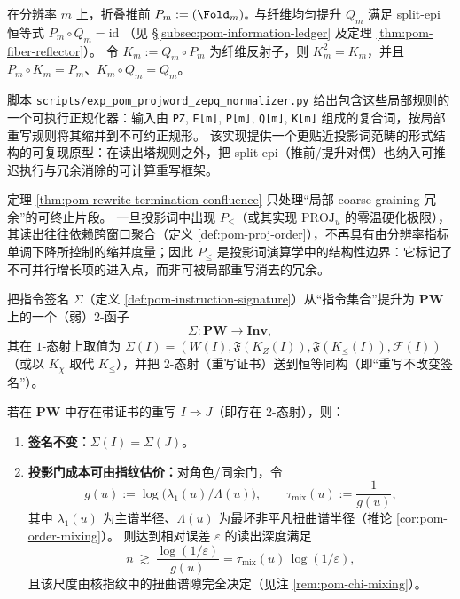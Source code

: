 \begin{remark}\label{rem:pom-projword-zepq-normalizer-script}
在分辨率 \(m\) 上，折叠推前 \(P_m:=(\Fold_m)_*\) 与纤维均匀提升 \(Q_m\) 满足 split-epi 恒等式
\(
P_m\circ Q_m=\mathrm{id}
\)
（见 \S\ref{subsec:pom-information-ledger} 及定理 \ref{thm:pom-fiber-reflector}）。
令 \(K_m:=Q_m\circ P_m\) 为纤维反射子，则 \(K_m^2=K_m\)，并且 \(P_m\circ K_m=P_m\)、\(K_m\circ Q_m=Q_m\)。
\par
脚本 \texttt{scripts/exp\_pom\_projword\_zepq\_normalizer.py} 给出包含这些局部规则的一个可执行正规化器：输入由 \texttt{PZ}, \texttt{E[m]}, \texttt{P[m]}, \texttt{Q[m]}, \texttt{K[m]} 组成的复合词，按局部重写规则将其缩并到不可约正规形。
该实现提供一个更贴近投影词范畴的形式结构的可复现原型：在读出塔规则之外，把 split-epi（推前/提升对偶）也纳入可推迟执行与冗余消除的可计算重写框架。
\end{remark}

\begin{remark}[边界：序投影 \texorpdfstring{$P_{\le}$}{P<=} 不属于局部可消去片段]\label{rem:pom-rewrite-boundary-order}
定理 \ref{thm:pom-rewrite-termination-confluence} 只处理“局部 coarse-graining 冗余”的可终止片段。
一旦投影词中出现 $P_{\le}$（或其实现 $\mathrm{PROJ}_u$ 的零温硬化极限），其读出往往依赖跨窗口聚合（定义 \ref{def:pom-proj-order}），不再具有由分辨率指标单调下降所控制的缩并度量；因此 $P_{\le}$ 是投影词演算学中的结构性边界：它标记了不可并行增长项的进入点，而非可被局部重写消去的冗余。
\end{remark}

\begin{definition}[签名函子与投影门估价]\label{def:pom-sigma-functor}
把指令签名 $\Sigma$（定义 \ref{def:pom-instruction-signature}）从“指令集合”提升为 $\mathbf{PW}$ 上的一个（弱）$2$-函子
\[
\Sigma:\mathbf{PW}\to \mathbf{Inv},
\]
其在 $1$-态射上取值为
\(
\Sigma(I)=(W(I),\mathfrak F(K_Z(I)),\mathfrak F(K_{\le}(I)),\mathcal F(I))
\)
（或以 $K_\chi$ 取代 $K_{\le}$），并把 $2$-态射（重写证书）送到恒等同构（即“重写不改变签名”）。
\end{definition}

\begin{proposition}[重写不变性与可估价闭环]\label{prop:pom-rewrite-audit-loop}
若在 $\mathbf{PW}$ 中存在带证书的重写 $I\Rightarrow J$（即存在 $2$-态射），则：
\begin{enumerate}
  \item \textbf{签名不变：}$\Sigma(I)=\Sigma(J)$。
  \item \textbf{投影门成本可由指纹估价：}对角色/同余门，令
  \[
  g(u):=\log\!\bigl(\lambda_1(u)/\Lambda(u)\bigr),
  \qquad
  \tau_{\mathrm{mix}}(u):=\frac{1}{g(u)},
  \]
  其中 $\lambda_1(u)$ 为主谱半径、$\Lambda(u)$ 为最坏非平凡扭曲谱半径（推论 \ref{cor:pom-order-mixing}）。
  则达到相对误差 $\varepsilon$ 的读出深度满足
  \[
  n\ \gtrsim\ \frac{\log(1/\varepsilon)}{g(u)}=\tau_{\mathrm{mix}}(u)\,\log(1/\varepsilon),
  \]
  且该尺度由核指纹中的扭曲谱隙完全决定（见注 \ref{rem:pom-chi-mixing}）。
\end{enumerate}
\end{proposition}

